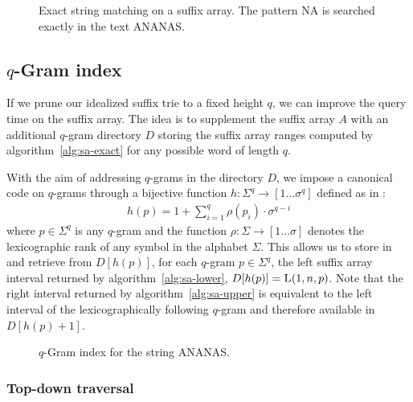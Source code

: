 \begin{figure}[h]
\begin{center}
\caption[Exact string matching on a suffix array.]{Exact string matching on a suffix array. The pattern NA is searched exactly in the text ANANAS.}
\label{fig:sa-exact}
%
\end{center}
\end{figure}

\subsection{$q$-Gram index}

If we prune our idealized suffix trie to a fixed height $q$, we can improve the query time on the suffix array.
The idea is to supplement the suffix array $A$ with an additional $q$-gram directory $D$ storing the suffix array ranges computed by algorithm~\ref{alg:sa-exact} for any possible word of length $q$.

With the aim of addressing $q$-grams in the directory $D$, we impose a canonical code on $q$-grams through a bijective function $h : \Sigma^q \rightarrow [1 \dots \sigma^q]$ defined as in \citep{Knuth1973}:
\begin{eqnarray}
h(p) = 1 + \sum_{i=1}^{q}{\rho(p_i) \cdot \sigma^{q-i}}
\end{eqnarray}
where $p \in \Sigma^q$ is any $q$-gram and the function $\rho : \Sigma \rightarrow [1 \dots \sigma]$ denotes the lexicographic rank of any symbol in the alphabet $\Sigma$.
This allows us to store in and retrieve from $D[h(p)]$, for each $q$-gram $p \in \Sigma^q$, the left suffix array interval returned by algorithm~\ref{alg:sa-lower}, \ie $D[h(p)] = \textsc{L}(1,n,p)$.
Note that the right interval returned by algorithm~\ref{alg:sa-upper} is equivalent to the left interval of the lexicographically following $q$-gram and therefore available in $D[h(p)+1]$.

\begin{figure}[h]
\caption{$q$-Gram index for the string ANANAS.}
\label{fig:qgram}
\begin{center}
\end{center}
\end{figure}

\subsubsection{Top-down traversal}

